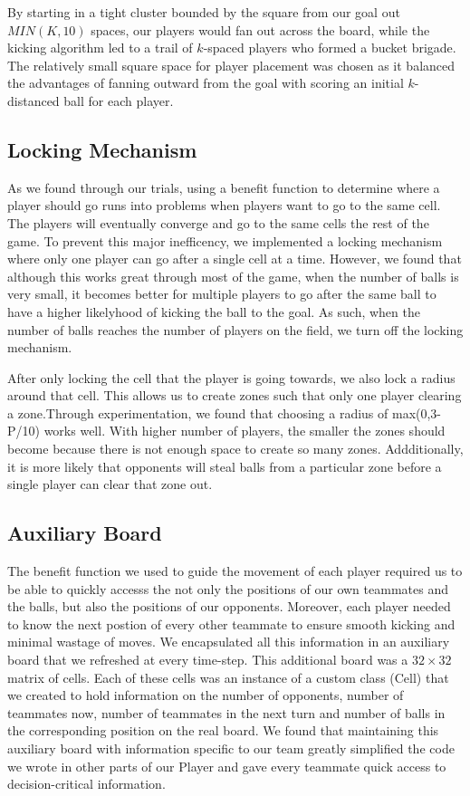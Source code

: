 \documentclass[
10pt, %
letterpaper, %
oneside, %
headinclude,footinclude, %
english
]{article}
\begin{document}
By starting in a tight cluster bounded by the square from our goal out $MIN(K,10)$ spaces, our players would fan out across the board, while the kicking algorithm led to a trail of $k$-spaced players who formed a bucket brigade. The relatively small square space for player placement was chosen as it balanced the advantages of fanning outward from the goal with scoring an initial $k$-distanced ball for each player.

\subsection{Locking Mechanism}
As we found through our trials, using a benefit function to determine where a player should go runs into problems when players want to go to the same cell. The players will eventually converge and go to the same cells the rest of the game. To prevent this major inefficency, we implemented a locking mechanism where only one player can go after a single cell at a time. However, we found that although this works great through most of the game, when the number of balls is very small, it becomes better for multiple players to go after the same ball to have a higher likelyhood of kicking the ball to the goal. As such, when the number of balls reaches the number of players on the field, we turn off the locking mechanism.

After only locking the cell that the player is going towards, we also lock a radius around that cell. This allows us to create zones such that only one player clearing a zone.Through experimentation, we found that choosing a radius of max(0,3-P/10) works well. With higher number of players, the smaller the zones should become because there is not enough space to create so many zones. Addditionally, it is more likely that opponents will steal balls from a particular zone before a single player can clear that zone out.

\subsection {Auxiliary Board}
The benefit function we used to guide the movement of each player required us to be able to quickly accesss the not only the positions of our own teammates and the balls, but also the positions of our opponents. Moreover, each player needed to know the next postion of every other teammate to ensure smooth kicking and minimal wastage of moves. We encapsulated all this information in an auxiliary board that we refreshed at every time-step. This additional board was a $32 \times 32$ matrix of cells. Each of these cells was an instance of a custom class (Cell) that we created to hold information on the number of opponents, number of teammates now, number of teammates in the next turn and number of balls in the corresponding position on the real board. We found that maintaining this auxiliary board with information specific to our team greatly simplified the code we wrote in other parts of our Player and gave every teammate quick access to decision-critical information.
\end{document}
